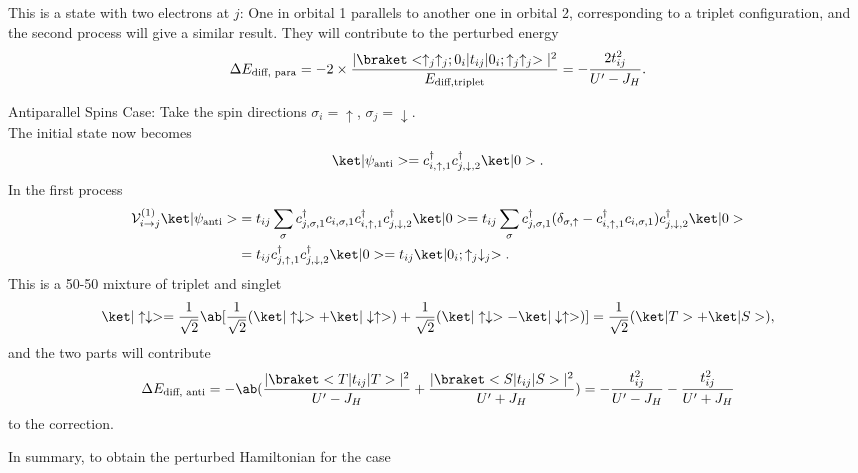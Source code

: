 \begin{solution}
\begin{enumext}[label = \Roman*.]
\begin{enumext}
\begin{enumext}[label = \arabic*.]
        This is a state with two electrons at $j$: One in orbital 1 parallels
        to another one in orbital 2, corresponding to a triplet configuration,
        and the second process will give a similar result.
        They will contribute to the perturbed energy
        \begin{equation}
          \Delta E_\text{diff, para}
          = -2 \times \frac{|\braket<\uparrow_j\uparrow_j;0_i|t_{ij}|
          0_i;\uparrow_j\uparrow_j>|^2} {E_\text{diff,triplet}}
          = -\frac{2t_{ij}^2}{U' - J_H}.
          \label{energy:diff_orbital_para}
        \end{equation}
        \item Antiparallel Spins Case: Take the spin
        directions $\sigma_i = \uparrow$, $\sigma_j = \downarrow$.\\
        The initial state now becomes
        \[
          \ket|\psi_\text{anti}> = c_{i,\uparrow,1}^\dagger
            c_{j, \downarrow, 2}^\dagger \ket|0>.
        \]
        In the first process
        \begin{align*}
          \mathcal V_{i\to j}^{(1)} \ket|\psi_\text{anti}> &
        = t_{ij} \sum_\sigma c_{j,\sigma,1}^\dagger c_{i,\sigma,1}
          c_{i,\uparrow,1}^\dagger c_{j,\downarrow,2}^\dagger \ket|0>
        = t_{ij} \sum_\sigma c_{j,\sigma,1}^\dagger
          (\delta_{\sigma,\uparrow} - c_{i,\uparrow,1}^\dagger c_{i,\sigma,1})
          c_{j,\downarrow,2}^\dagger \ket|0>\\
      & = t_{ij} c_{j,\uparrow,1}^\dagger c_{j,\downarrow,2}^\dagger \ket|0>
        = t_{ij} \ket|0_i;\uparrow_j\downarrow_j>.
        \end{align*}
        This is a 50-50 mixture of triplet and singlet
        \[
          \ket|\uparrow\downarrow>
        = \frac1{\sqrt2}\ab[\frac1{\sqrt2}
            (\ket|\uparrow\downarrow> + \ket|\downarrow\uparrow>)
          + \frac1{\sqrt2}
            (\ket|\uparrow\downarrow> - \ket|\downarrow\uparrow>)]
        = \frac1{\sqrt2}(\ket|T> + \ket|S>),
        \]
        and the two parts will contribute
        \begin{equation}
          \Delta E_\text{diff, anti} = -\ab(
          \frac{|\braket<T|t_{ij}|T>|^2}{U' - J_H}
        + \frac{|\braket<S|t_{ij}|S>|^2}{U' + J_H})
        = -\frac{t_{ij}^2}{U' - J_H} - \frac{t_{ij}^2}{U' + J_H}
          \label{energy:diff_orbital_anti}
          \end{equation}
        to the correction.
      \end{enumext}
      In summary, to obtain the perturbed Hamiltonian for the case

\end{enumext}
\end{enumext}
\end{solution}
